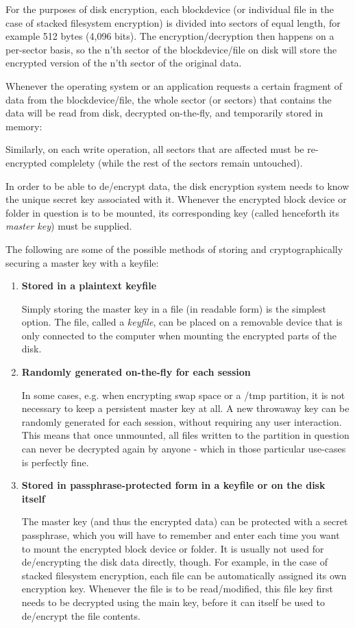 For the purposes of disk encryption, each blockdevice (or individual file in the case of stacked filesystem encryption) is divided into sectors of equal length, for example 512 bytes (4,096 bits). The encryption/decryption then happens on a per-sector basis, so the n'th sector of the blockdevice/file on disk will store the encrypted version of the n'th sector of the original data.

Whenever the operating system or an application requests a certain fragment of data from the blockdevice/file, the whole sector (or sectors) that contains the data will be read from disk, decrypted on-the-fly, and temporarily stored in memory:

Similarly, on each write operation, all sectors that are affected must be re-encrypted complelety (while the rest of the sectors remain untouched).

In order to be able to de/encrypt data, the disk encryption system needs to know the unique secret key associated with it. Whenever the encrypted block device or folder in question is to be mounted, its corresponding key (called henceforth its \textit{master key}) must be supplied.

The following are some of the possible methods of storing and cryptographically securing a master key with a keyfile:
\begin{enumerate}
\item \textbf{Stored in a plaintext keyfile}

Simply storing the master key in a file (in readable form) is the simplest option. The file, called a \textit{keyfile}, can be placed on a removable device that is only connected to the computer when mounting the encrypted parts of the disk.

\item \textbf{Randomly generated on-the-fly for each session}

In some cases, e.g. when encrypting swap space or a /tmp partition, it is not necessary to keep a persistent master key at all. A new throwaway key can be randomly generated for each session, without requiring any user interaction. This means that once unmounted, all files written to the partition in question can never be decrypted again by anyone - which in those particular use-cases is perfectly fine.

\item \textbf{Stored in passphrase-protected form in a keyfile or on the disk itself}

The master key (and thus the encrypted data) can be protected with a secret passphrase, which you will have to remember and enter each time you want to mount the encrypted block device or folder.
It is usually not used for de/encrypting the disk data directly, though. For example, in the case of stacked filesystem encryption, each file can be automatically assigned its own encryption key. Whenever the file is to be read/modified, this file key first needs to be decrypted using the main key, before it can itself be used to de/encrypt the file contents.

\end{enumerate}

